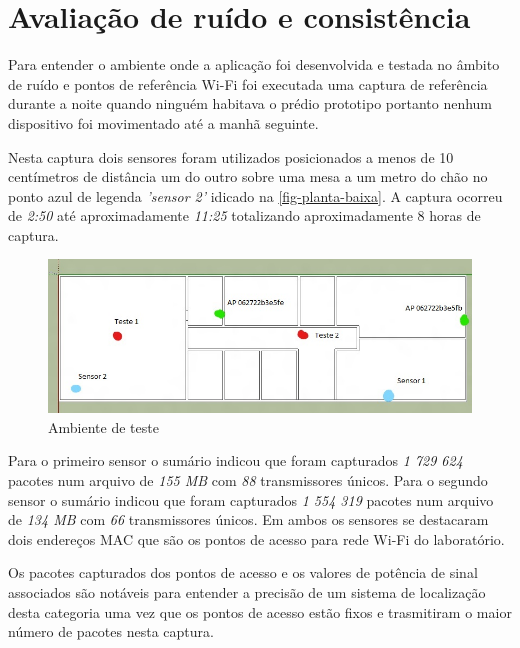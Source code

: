 \section{Avaliação de ruído e consistência}
\label{sec:teste-ruido}

Para entender o ambiente onde a aplicação foi desenvolvida e testada no âmbito
de ruído e pontos de referência Wi-Fi foi executada uma captura de referência
durante a noite quando ninguém habitava o prédio prototipo portanto nenhum
dispositivo foi movimentado até a manhã seguinte.

Nesta captura dois sensores foram utilizados posicionados a menos de 10
centímetros de distância um do outro sobre uma mesa a um metro do chão no ponto
azul de legenda \emph{'sensor 2'} idicado na \autoref{fig-planta-baixa}. A captura
ocorreu de \emph{2:50} até aproximadamente \emph{11:25} totalizando aproximadamente 8 horas de
captura.

\begin{figure}[htb]
	\caption{\label{fig-planta-baixa}Ambiente de teste}
	\begin{center}
		\includegraphics[width=1\textwidth]{060-testes/data-analisis/planta-baixa_Ink_LI.jpg}
	\end{center}
\end{figure}


Para o primeiro sensor o sumário indicou que foram capturados \emph{1 729 624}
pacotes num arquivo de \emph{155 MB} com \emph{88} transmissores únicos.
Para o segundo sensor o sumário indicou que foram capturados \emph{1 554 319}
pacotes num arquivo de \emph{134 MB} com \emph{66} transmissores únicos.
Em ambos os sensores se destacaram dois endereços MAC que são os pontos de
acesso para rede Wi-Fi do laboratório.

Os pacotes capturados dos pontos de acesso e os valores de potência de sinal
associados são notáveis para entender a precisão de um sistema de localização
desta categoria uma vez que os pontos de acesso estão fixos e trasmitiram o
maior número de pacotes nesta captura.

